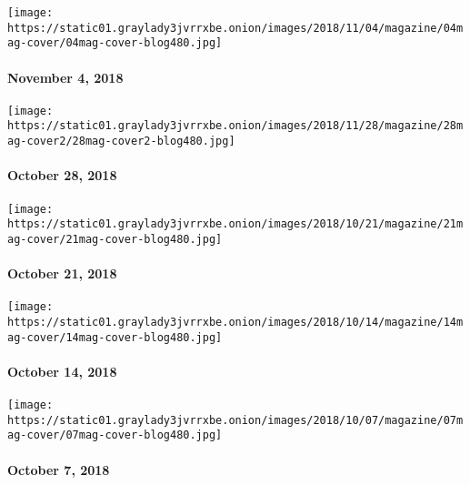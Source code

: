 \href{https://www.nytimes3xbfgragh.onion/issue/magazine/2018/11/02/the-11042018-issue}{}

\texttt{[image: https://static01.graylady3jvrrxbe.onion/images/2018/11/04/magazine/04mag-cover/04mag-cover-blog480.jpg]}

\hypertarget{november-4-2018}{%
\paragraph{November 4, 2018}\label{november-4-2018}}

\href{https://www.nytimes3xbfgragh.onion/issue/magazine/2018/10/26/the-102818-issue}{}

\texttt{[image: https://static01.graylady3jvrrxbe.onion/images/2018/11/28/magazine/28mag-cover2/28mag-cover2-blog480.jpg]}

\hypertarget{october-28-2018}{%
\paragraph{October 28, 2018}\label{october-28-2018}}

\href{https://www.nytimes3xbfgragh.onion/issue/magazine/2018/10/19/the-102118-issue}{}

\texttt{[image: https://static01.graylady3jvrrxbe.onion/images/2018/10/21/magazine/21mag-cover/21mag-cover-blog480.jpg]}

\hypertarget{october-21-2018}{%
\paragraph{October 21, 2018}\label{october-21-2018}}

\href{https://www.nytimes3xbfgragh.onion/issue/magazine/2018/10/12/the-101418-issue}{}

\texttt{[image: https://static01.graylady3jvrrxbe.onion/images/2018/10/14/magazine/14mag-cover/14mag-cover-blog480.jpg]}

\hypertarget{october-14-2018}{%
\paragraph{October 14, 2018}\label{october-14-2018}}

\href{https://www.nytimes3xbfgragh.onion/issue/magazine/2018/10/08/the-100718-issue}{}

\texttt{[image: https://static01.graylady3jvrrxbe.onion/images/2018/10/07/magazine/07mag-cover/07mag-cover-blog480.jpg]}

\hypertarget{october-7-2018}{%
\paragraph{October 7, 2018}\label{october-7-2018}}

